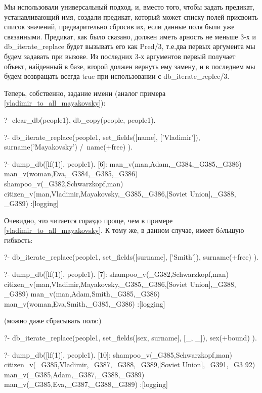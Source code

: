 \documentclass[a4paper]{book}
\def\te{т.\thinspace е.}
\begin{document}
Мы использовали универсальный подход, и, вместо того, чтобы
задать предикат, устанавливающий имя, создали предикат, который
может списку полей присвоить список значений, предварительно
сбросив их, если данные поля были уже связанными. Предикат, как
было сказано, должен иметь арность не меньше 3-х и
db_iterate_replace будет вызывать его как Pred/3, \te два первых
аргумента мы будем задавать при вызове. Из последних 3-х
аргументов первый получает объект, найденный в базе, второй
должен вернуть ему замену, и в последнем мы будем возвращать
всегда true при использовании с db_iterate_replce/3.

Теперь, собственно, задание имени (аналог примера
\ref{vladimir_to_all_mayakovsky}):

\begin{example}{}{}
?- clear_db(people1), db_copy(people, people1).

?- db_iterate_replace(people1, 
      set_fields([name], ['Vladimir']), 
      surname('Mayakovsky') /\ name(+free)
      ).

?- dump_db([lf(1)], people1).
[6]: man_v(man,Adam,_G384,_G385,_G386) 
man_v(woman,Eva,_G384,_G385,_G386) 
shampoo_v(_G382,Schwarzkopf,man) 
citizen_v(man,Vladimir,Mayakovsky,_G385,_G386,[Soviet Union],_G388,
_G389)                                                            
 :[logging]
\end{example}

Очевидно, это читается гораздо проще, чем в примере
\ref{vladimir_to_all_mayakovsky}. К тому же, в данном случае,
имеет б\'oльшую гибкость:

\begin{example}{}{}
?- db_iterate_replace(people1, 
      set_fields([surname], ['Smith']), 
      surname(+free)
   ). 

?- dump_db([lf(1)], people1).
[7]: shampoo_v(_G382,Schwarzkopf,man) 
citizen_v(man,Vladimir,Mayakovsky,_G385,_G386,[Soviet Union],_G388,
_G389)                                                            
man_v(man,Adam,Smith,_G385,_G386) 
man_v(woman,Eva,Smith,_G385,_G386) 
 :[logging]
\end{example}

(можно даже сбрасывать поля:)

\begin{example}{}{}
?- db_iterate_replace(people1, 
      set_fields([sex, surname], [_, _]), 
      sex(+bound)
   ).                                                     

?- dump_db([lf(1)], people1).
[10]: shampoo_v(_G385,Schwarzkopf,man) 
citizen_v(_G385,Vladimir,_G387,_G388,_G389,[Soviet Union],_G391,_G3
92)                                                               
man_v(_G385,Adam,_G387,_G388,_G389) 
man_v(_G385,Eva,_G387,_G388,_G389) 
 :[logging]
\end{example}
\end{document}

